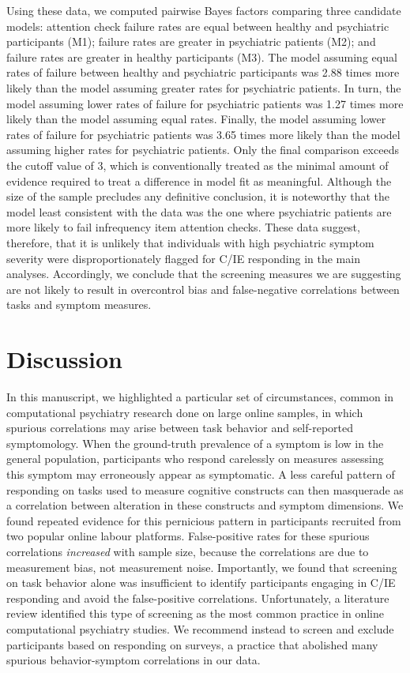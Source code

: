 \documentclass[a4paper,notitlepage,12pt]{article}
\begin{document}
\begin{refsection}[main]
Using these data, we computed pairwise Bayes factors comparing three candidate models: attention check failure rates are equal between healthy and psychiatric participants (M1); failure rates are greater in psychiatric patients (M2); and failure rates are greater in healthy participants (M3). The model assuming equal rates of failure between healthy and psychiatric participants was 2.88 times more likely than the model assuming greater rates for psychiatric patients. In turn, the model assuming lower rates of failure for psychiatric patients was 1.27 times more likely than the model assuming equal rates. Finally, the model assuming lower rates of failure for psychiatric patients was 3.65 times more likely than the model assuming higher rates for psychiatric patients. Only the final comparison exceeds the cutoff value of 3, which is conventionally treated as the minimal amount of evidence required to treat a difference in model fit as meaningful. Although the size of the sample precludes any definitive conclusion, it is noteworthy that the model least consistent with the data was the one where psychiatric patients are more likely to fail infrequency item attention checks. These data suggest, therefore, that it is unlikely that individuals with high psychiatric symptom severity were disproportionately flagged for C/IE responding in the main analyses. Accordingly, we conclude that the screening measures we are suggesting are not likely to result in overcontrol bias and false-negative correlations between tasks and symptom measures.

\section{Discussion}

In this manuscript, we highlighted a particular set of circumstances, common in computational psychiatry research done on large online samples, in which spurious correlations may arise between task behavior and self-reported symptomology. When the ground-truth prevalence of a symptom is low in the general population, participants who respond carelessly on measures assessing this symptom may erroneously appear as symptomatic. A less careful pattern of responding on tasks used to measure cognitive constructs can then masquerade as a correlation between alteration in these constructs and symptom dimensions. We found repeated evidence for this pernicious pattern in participants recruited from two popular online labour platforms. False-positive rates for these spurious correlations \emph{increased} with sample size, because the correlations are due to measurement bias, not measurement noise. Importantly, we found that screening on task behavior alone was insufficient to identify participants engaging in C/IE responding and avoid the false-positive correlations. Unfortunately, a literature review identified this type of screening as the most common practice in online computational psychiatry studies. We recommend instead to screen and exclude participants based on responding on surveys, a practice that abolished many spurious behavior-symptom correlations in our data. 


\end{refsection}
\end{document}
